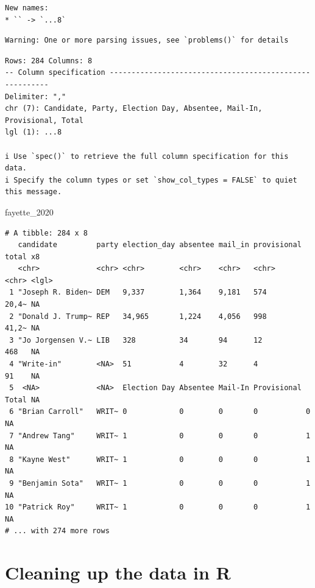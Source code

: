\documentclass[
  letterpaper,
  DIV=11,
  numbers=noendperiod]{scrreprt}
\newenvironment{Shaded}{\begin{snugshade}}{\end{snugshade}}
\newcommand{\NormalTok}[1]{\textcolor[rgb]{0.00,0.23,0.31}{#1}}
\begin{document}
\begin{verbatim}
New names:
* `` -> `...8`
\end{verbatim}

\begin{verbatim}
Warning: One or more parsing issues, see `problems()` for details
\end{verbatim}

\begin{verbatim}
Rows: 284 Columns: 8
-- Column specification --------------------------------------------------------
Delimiter: ","
chr (7): Candidate, Party, Election Day, Absentee, Mail-In, Provisional, Total
lgl (1): ...8

i Use `spec()` to retrieve the full column specification for this data.
i Specify the column types or set `show_col_types = FALSE` to quiet this message.
\end{verbatim}

\begin{Shaded}
\begin{Highlighting}[]
\NormalTok{fayette\_2020}
\end{Highlighting}
\end{Shaded}

\begin{verbatim}
# A tibble: 284 x 8
   candidate         party election_day absentee mail_in provisional total x8   
   <chr>             <chr> <chr>        <chr>    <chr>   <chr>       <chr> <lgl>
 1 "Joseph R. Biden~ DEM   9,337        1,364    9,181   574         20,4~ NA   
 2 "Donald J. Trump~ REP   34,965       1,224    4,056   998         41,2~ NA   
 3 "Jo Jorgensen V.~ LIB   328          34       94      12          468   NA   
 4 "Write-in"        <NA>  51           4        32      4           91    NA   
 5  <NA>             <NA>  Election Day Absentee Mail-In Provisional Total NA   
 6 "Brian Carroll"   WRIT~ 0            0        0       0           0     NA   
 7 "Andrew Tang"     WRIT~ 1            0        0       0           1     NA   
 8 "Kayne West"      WRIT~ 1            0        0       0           1     NA   
 9 "Benjamin Sota"   WRIT~ 1            0        0       0           1     NA   
10 "Patrick Roy"     WRIT~ 1            0        0       0           1     NA   
# ... with 274 more rows
\end{verbatim}

\hypertarget{cleaning-up-the-data-in-r}{%
\section{Cleaning up the data in R}\label{cleaning-up-the-data-in-r}}
\end{document}
